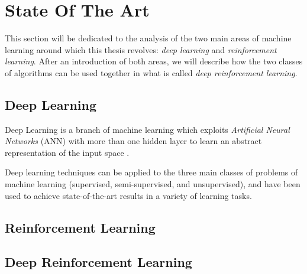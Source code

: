\chapter{State Of The Art}
\label{ch2_SOA}
\thispagestyle{empty}

\vspace{0.5cm}

\noindent This section will be dedicated to the analysis of the two main areas 
of machine learning around which this thesis revolves: \textit{deep learning} 
and \textit{reinforcement learning}. 
After an introduction of both areas, we 
will describe how the two classes of algorithms can be used together in what is 
called \textit{deep reinforcement learning}.

\section{Deep Learning}
Deep Learning is a branch of machine learning which exploits \textit{Artificial 
Neural Networks} (ANN) with more than one hidden layer to learn an abstract 
representation of the input space \cite{lecun2015deep}. 

Deep learning techniques can be applied to the three main classes of problems 
of machine learning (supervised, semi-supervised, and unsupervised), and have 
been used to achieve state-of-the-art results in a variety of learning tasks.


\section{Reinforcement Learning}

\section{Deep Reinforcement Learning}


